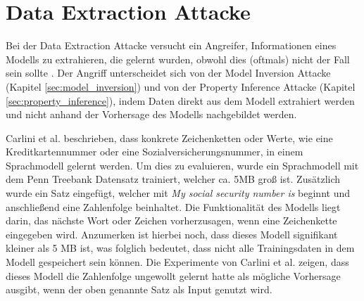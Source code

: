 \section{Data Extraction Attacke}

Bei der Data Extraction Attacke versucht ein Angreifer, Informationen eines Modells zu extrahieren, die gelernt wurden, obwohl dies (oftmals) nicht der Fall sein sollte \cite{P-87}.
Der Angriff unterscheidet sich von der Model Inversion Attacke (Kapitel \ref{sec:model_inversion}) und von der Property Inference Attacke (Kapitel \ref{sec:property_inference}), indem Daten direkt aus dem Modell extrahiert werden und nicht anhand der Vorhersage des Modells nachgebildet werden.

Carlini et al. \cite{P-87} beschrieben, dass konkrete Zeichenketten oder Werte, wie eine Kreditkartennummer oder eine Sozialversicherungsnummer, in einem Sprachmodell gelernt werden.
Um dies zu evaluieren, wurde ein Sprachmodell mit dem Penn Treebank Datensatz trainiert, welcher ca. 5MB groß ist. 
Zusätzlich wurde ein Satz eingefügt, welcher mit \textit{\dq My social security number is \dq} beginnt und anschließend eine Zahlenfolge beinhaltet.
Die Funktionalität des Modells liegt darin, das nächste Wort oder Zeichen vorherzusagen, wenn eine Zeichenkette eingegeben wird.
Anzumerken ist hierbei noch, dass dieses Modell signifikant kleiner als 5 MB ist, was folglich bedeutet, dass nicht alle Trainingsdaten in dem Modell gespeichert sein können.
Die Experimente von Carlini et al. \cite{P-87} zeigen, dass dieses Modell die Zahlenfolge ungewollt gelernt hatte als mögliche Vorhersage ausgibt, wenn der oben genannte Satz als Input genutzt wird.

